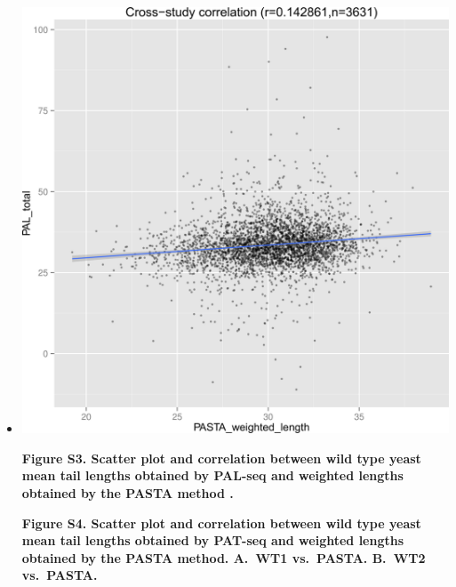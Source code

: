 \documentclass[10pt]{article}
\begin{document}
\begin{itemize}
	
\item[]{
\includegraphics[scale=0.8]{FigureS3.png}

\textbf{Figure S3. Scatter plot and correlation between wild type yeast mean tail lengths obtained by PAL-seq \cite{subtelny14} and weighted lengths obtained by the PASTA method \cite{beilharz07}. }
}


\textbf{Figure S4. Scatter plot and correlation between wild type yeast mean tail lengths obtained by PAT-seq and weighted lengths obtained by the PASTA method. \textbf{A.}~WT1 vs.\ PASTA. \textbf{B.}~WT2 vs.\ PASTA. }

\end{itemize}
\end{document}
